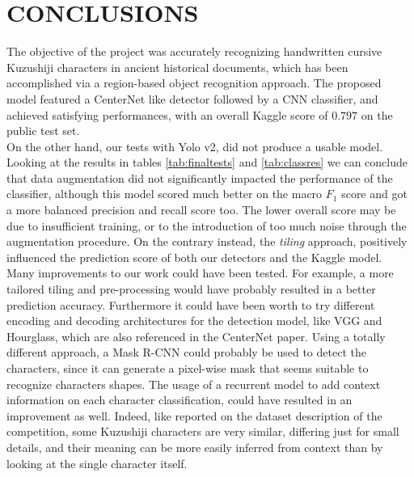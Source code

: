 \section{CONCLUSIONS}
\label{sec:conclusions}

The objective of the project was accurately recognizing handwritten cursive Kuzushiji characters in ancient historical documents, which has been accomplished via a region-based object recognition approach. The proposed model featured a CenterNet like detector followed by a CNN classifier, and achieved satisfying performances, with an overall Kaggle score of $0.797$ on the public test set.\\
On the other hand, our tests with Yolo v2, did not produce a usable model.\\ Looking at the results in tables \ref{tab:finaltests} and \ref{tab:classres} we can conclude that data augmentation did not significantly impacted the performance of the classifier, although this model scored much better on the macro $F_1$ score and got a more balanced precision and recall score too. The lower overall score may be due to insufficient training, or to the introduction of too much noise through the augmentation procedure. On the contrary instead, the \textit{tiling} approach, positively influenced the prediction score of both our detectors and the Kaggle model. \\
Many improvements to our work could have been tested. For example, a more tailored tiling and pre-processing would have probably resulted in a better prediction accuracy. Furthermore it could have been worth to try different encoding and decoding architectures for the detection model, like VGG and Hourglass, which are also referenced in the CenterNet paper. Using a totally different approach, a Mask R-CNN could probably be used to detect the characters, since it can generate a pixel-wise mask that seems suitable to recognize characters shapes. The usage of a recurrent model to add context information on each character classification, could have resulted in an improvement as well. Indeed, like reported on the dataset description of the competition, some Kuzushiji characters are very similar, differing just for small details, and their meaning can be more easily inferred from context than by looking at the single character itself.
